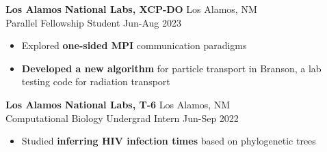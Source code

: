 \documentclass[12pt]{article}
\newcommand{\entry}[4]{{{\textbf{#1}}} \hfill #3 \\ #2 \hfill #4}
\begin{document}
\begin{minipage}[t]{0.63\textwidth}
  \medskip

  \entry{Los Alamos National Labs, XCP-DO}{Parallel Fellowship Student}{Los Alamos, NM}{Jun-Aug 2023}
  \begin{itemize}[noitemsep,rightmargin=0mm,topsep=0pt,leftmargin=.75cm]
    \item Explored {\bf one-sided MPI} communication paradigms
    \item {\bf Developed a new algorithm} for particle transport in Branson, a lab testing code for radiation transport
  \end{itemize}

  \medskip

  \entry{Los Alamos National Labs, T-6}{Computational Biology Undergrad Intern}{Los Alamos, NM}{Jun-Sep 2022}
  \begin{itemize}[noitemsep,rightmargin=0mm,topsep=0pt,leftmargin=.75cm]
    \item Studied {\bf inferring HIV infection times} based on phylogenetic trees
  \end{itemize}
\end{minipage}%
\hspace{0.04\textwidth}%
\end{document}
